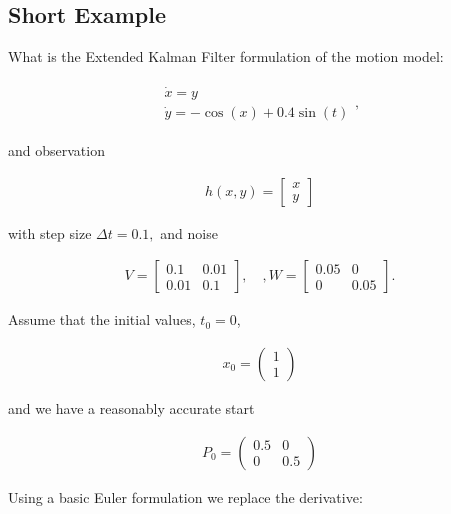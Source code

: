 \hypertarget{short-example}{%
\subsection{Short Example}\label{short-example}}

What is the Extended Kalman Filter formulation of the motion model:

\[\begin{aligned}
\begin{array}{l}\dot{x} = y \\\dot{y} = -\cos(x) + 0.4\sin(t)\end{array},
\end{aligned}\]

and observation

\[\begin{aligned}
h(x,y) = \begin{bmatrix}x \\ y\end{bmatrix}
\end{aligned}\]

with step size \(\Delta t = 0.1,\) and noise

\[\begin{aligned}
V = \begin{bmatrix} 0.1&0.01\\0.01& 0.1\end{bmatrix}, \quad , W = \begin{bmatrix} 0.05&0\\0& 0.05\end{bmatrix}.
\end{aligned}\]

Assume that the initial values, \(t_0 = 0\),

\[\begin{aligned}
x_0 = \begin{pmatrix} 1 \\ 1 \end{pmatrix}
\end{aligned}\]

and we have a reasonably accurate start

\[\begin{aligned}
P_0 = \begin{pmatrix} 0.5 & 0 \\ 0 & 0.5   \end{pmatrix}
\end{aligned}\]

Using a basic Euler formulation we replace the derivative:

